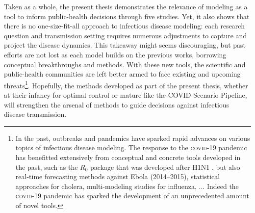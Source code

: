 Taken as a whole, the present thesis demonstrates the relevance of modeling as a tool to inform public-health decisions through five studies. Yet, it also shows that there is no one-size-fit-all approach to infectious disease modeling: each research question and transmission setting requires numerous adjustments to capture and project the disease dynamics. %
This takeaway might seems discouraging, but past efforts are not lost as each model builds on the previous works, borrowing conceptual breakthroughs and methods. With these new tools, %
 the scientific and public-health communities are left better armed to face existing and upcoming threats\footnote[][-3\baselineskip]{In the past, outbreaks and pandemics have sparked rapid advances on various topics of infectious disease modeling. The response to the \textsc{covid}-19 pandemic has benefitted extensively from conceptual and concrete tools developed in the past, such as the $R_0$ package that was developed after H1N1 \parencite{Obadia:R0PackageToolbox:2012}, but also \eg real-time forecasting methods against Ebola (2014--2015), statistical approaches for cholera, multi-modeling studies for influenza, ... Indeed the \textsc{covid}-19 pandemic has sparked the development of an unprecedented amount of novel tools.}. Hopefully, the methods developed as part of the present thesis, whether at their infancy for optimal control or mature like the COVID Scenario Pipeline, will strengthen the arsenal of methods to guide decisions against infectious disease transmission.
  
